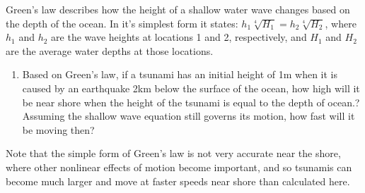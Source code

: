 \documentclass[12pt]{article}
\begin{document}
Green's law describes how the height of a shallow water wave changes based on the depth of the ocean. In it's simplest form it states: $h_1\sqrt[4]{H_1}=h_2\sqrt[4]{H_2}$, where $h_1$ and $h_2$ are the wave heights at locations 1 and 2, respectively, and $H_1$ and $H_2$ are the average water depths at those locations. 

\begin{enumerate}[resume]
\item Based on Green's law, if a tsunami has an initial height of 1m when it is caused by an earthquake 2km below the surface of the ocean, how high will it be near shore when the height of the tsunami is equal to the depth of ocean.? Assuming the shallow wave equation still governs its motion, how fast will it be moving then?
\end{enumerate}

Note that the simple form of Green's law is not very accurate near the shore, where other nonlinear effects of motion become important, and so tsunamis can become much larger and move at faster speeds near shore than calculated here.
\end{document}
